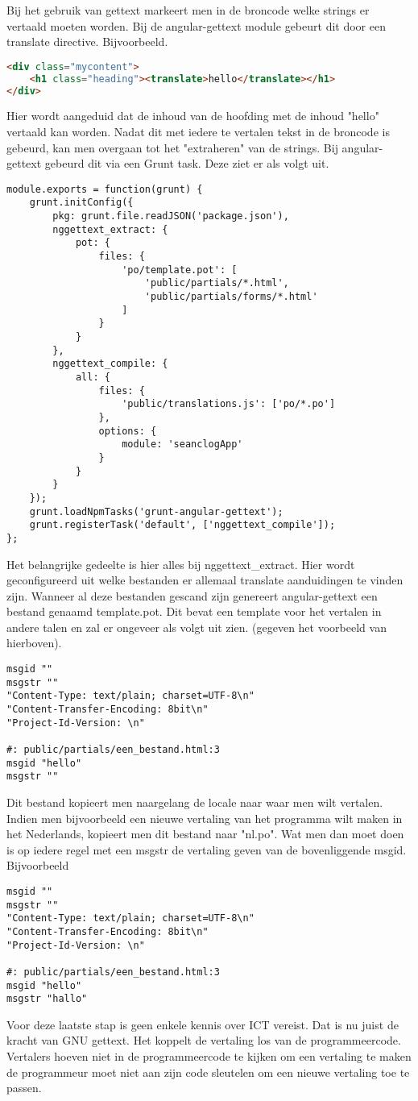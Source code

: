 \documentclass[a4paper,11pt]{article}
\begin{document}
Bij het gebruik van gettext markeert men in de broncode welke strings er vertaald moeten worden. Bij de angular-gettext module gebeurt dit door een translate directive. Bijvoorbeeld.
\begin{lstlisting}[language=html]
<div class="mycontent">
	<h1 class="heading"><translate>hello</translate></h1>
</div>
\end{lstlisting}
Hier wordt aangeduid dat de inhoud van de hoofding met de inhoud "hello" vertaald kan worden. Nadat dit met iedere te vertalen tekst in de broncode is gebeurd, kan men overgaan tot het "extraheren" van de strings. Bij angular-gettext gebeurd dit via een Grunt task. Deze ziet er als volgt uit.
\begin{lstlisting}
module.exports = function(grunt) {
	grunt.initConfig({
		pkg: grunt.file.readJSON('package.json'),
		nggettext_extract: {
			pot: {
				files: {
					'po/template.pot': [
						'public/partials/*.html',
						'public/partials/forms/*.html'
					]
				}
			}
		},
		nggettext_compile: {
			all: {
				files: {
					'public/translations.js': ['po/*.po']
				},
				options: {
					module: 'seanclogApp'
				}
			}
		}
	});
	grunt.loadNpmTasks('grunt-angular-gettext');
	grunt.registerTask('default', ['nggettext_compile']);
};
\end{lstlisting}
Het belangrijke gedeelte is hier alles bij nggettext\_extract. Hier wordt geconfigureerd uit welke bestanden er allemaal translate aanduidingen te vinden zijn. Wanneer al deze bestanden gescand zijn genereert angular-gettext een bestand genaamd template.pot. Dit bevat een template voor het vertalen in andere talen en zal er ongeveer als volgt uit zien. (gegeven het voorbeeld van hierboven).
\begin{lstlisting}
msgid ""
msgstr ""
"Content-Type: text/plain; charset=UTF-8\n"
"Content-Transfer-Encoding: 8bit\n"
"Project-Id-Version: \n"

#: public/partials/een_bestand.html:3
msgid "hello"
msgstr ""
\end{lstlisting}
Dit bestand kopieert men naargelang de locale naar waar men wilt vertalen. Indien men bijvoorbeeld een nieuwe vertaling van het programma wilt maken in het Nederlands, kopieert men dit bestand naar "nl.po". Wat men dan moet doen is op iedere regel met een msgstr de vertaling geven van de bovenliggende msgid. Bijvoorbeeld
\begin{lstlisting}
msgid ""
msgstr ""
"Content-Type: text/plain; charset=UTF-8\n"
"Content-Transfer-Encoding: 8bit\n"
"Project-Id-Version: \n"

#: public/partials/een_bestand.html:3
msgid "hello"
msgstr "hallo"
\end{lstlisting}
Voor deze laatste stap is geen enkele kennis over ICT vereist. Dat is nu juist de kracht van GNU gettext. Het koppelt de vertaling los van de programmeercode. Vertalers hoeven niet in de programmeercode te kijken om een vertaling te maken de programmeur moet niet aan zijn code sleutelen om een nieuwe vertaling toe te passen.
\end{document}
